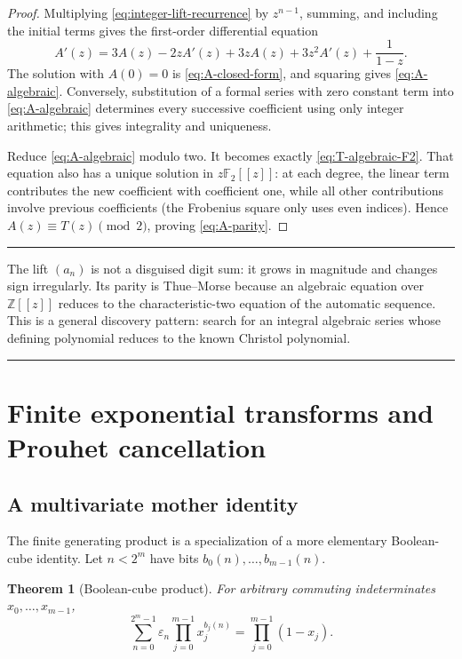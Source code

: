 \documentclass[11pt,oneside]{article}
\newtheorem{theorem}{Theorem}[section]
\theoremstyle{definition}
\theoremstyle{remark}
\newcommand{\Ftwo}{\mathbb F_2}
\newcommand{\eps}{\varepsilon}
\newenvironment{boxedremark}{%
  \par\smallskip\noindent\begin{center}\begin{minipage}{0.94\textwidth}%
  \color{black}\hrule\vspace{0.6em}\small
}{%
  \vspace{0.6em}\hrule\end{minipage}\end{center}\smallskip
}
\begin{document}
\begin{proof}
Multiplying \eqref{eq:integer-lift-recurrence} by \(z^{n-1}\), summing, and
including the initial terms gives the first-order differential equation
\[
  A'(z)=3A(z)-2zA'(z)+3zA(z)+3z^2A'(z)+\frac1{1-z}.
\]
The solution with \(A(0)=0\) is \eqref{eq:A-closed-form}, and squaring gives
\eqref{eq:A-algebraic}.  Conversely, substitution of a formal series with
zero constant term into \eqref{eq:A-algebraic} determines every successive
coefficient using only integer arithmetic; this gives integrality and
uniqueness.

Reduce \eqref{eq:A-algebraic} modulo two.  It becomes exactly
\eqref{eq:T-algebraic-F2}.  That equation also has a unique solution in
\(z\Ftwo[[z]]\): at each degree, the linear term contributes the new
coefficient with coefficient one, while all other contributions involve
previous coefficients (the Frobenius square only uses even indices).  Hence
\(A(z)\equiv T(z)\pmod2\), proving \eqref{eq:A-parity}.
\end{proof}

\begin{boxedremark}
The lift \((a_n)\) is not a disguised digit sum: it grows in magnitude and
changes sign irregularly.  Its parity is Thue--Morse because an algebraic
equation over \(\mathbb Z[[z]]\) reduces to the characteristic-two equation
of the automatic sequence.  This is a general discovery pattern: search for
an integral algebraic series whose defining polynomial reduces to the known
Christol polynomial.
\end{boxedremark}

\section{Finite exponential transforms and Prouhet cancellation}
\label{sec:exponential}

\subsection{A multivariate mother identity}

The finite generating product is a specialization of a more elementary
Boolean-cube identity.  Let \(n<2^m\) have bits
\(b_0(n),\ldots,b_{m-1}(n)\).

\begin{theorem}[Boolean-cube product]
For arbitrary commuting indeterminates \(x_0,\ldots,x_{m-1}\),
\begin{equation}
  \boxed{
  \sum_{n=0}^{2^m-1}\eps_n
    \prod_{j=0}^{m-1}x_j^{b_j(n)}
  =\prod_{j=0}^{m-1}(1-x_j).}
  \label{eq:boolean-mother}
\end{equation}
\end{theorem}
\end{document}
